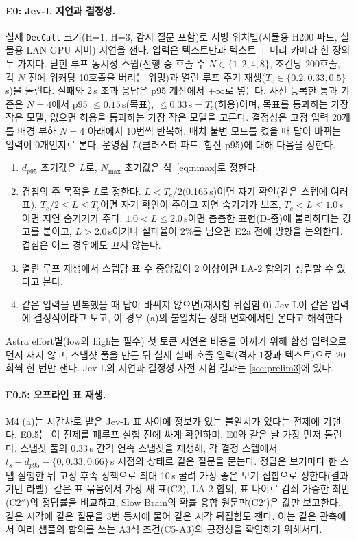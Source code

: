 \paragraph{E0: Jev-L 지연과 결정성.}
실제 \texttt{DecCall} 크기(H=1, H=3, 감시 질문 포함)로 서빙 위치별(시뮬용 H200 파드, 실물용 LAN GPU 서버) 지연을 잰다. 입력은 텍스트만과 텍스트 + 머리 카메라 한 장의 두 가지다. 닫힌 루프 동시성 스윕(진행 중 호출 수 $N\in\{1,2,4,8\}$, 조건당 200호출, 각 $N$ 전에 워커당 10호출을 버리는 워밍)과 열린 루프 주기 재생($T_c\in\{0.2,0.33,0.5\}$\,s)을 돌린다. 실패와 2\,s 초과 응답은 p95 계산에서 $+\infty$로 넣는다. 사전 등록한 통과 기준은 $N=4$에서 p95 $\le0.15$\,s(목표), $\le0.33$\,s$=T_c$(허용)이며, 목표를 통과하는 가장 작은 모델, 없으면 허용을 통과하는 가장 작은 모델을 고른다. 결정성은 고정 입력 20개를 배경 부하 $N=4$ 아래에서 10번씩 반복해, 배치 불변 모드를 켰을 때 답이 바뀌는 입력이 0개인지로 본다. 운영점 $L$(클러스터 파드, 합산 p95)에 대해 다음을 정한다.
\begin{enumerate}
  \item $d_{p95}$ 초기값은 $L$로, $N_{\max}$ 초기값은 식~\eqref{eq:nmax}로 정한다.
  \item 겹침의 주 목적을 $L$로 정한다. $L<T_c/2$(0.165\,s)이면 자기 확인(같은 스텝에 여러 표), $T_c/2\le L\le T_c$이면 자기 확인이 주이고 지연 숨기기가 보조, $T_c<L\le1.0$\,s이면 지연 숨기기가 주다. $1.0<L\le2.0$\,s이면 촘촘한 표현(D-줌)에 불리하다는 경고를 붙이고, $L>2.0$\,s이거나 실패율이 2\%를 넘으면 E2a 전에 방향을 논의한다. 겹침은 어느 경우에도 끄지 않는다.
  \item 열린 루프 재생에서 스텝당 표 수 중앙값이 2 이상이면 LA-2 합의가 성립할 수 있다고 본다.
  \item 같은 입력을 반복했을 때 답이 바뀌지 않으면(재시험 뒤집힘 0) Jev-L이 같은 입력에 결정적이라고 보고, 이 경우 (a)의 불일치는 상태 변화에서만 온다고 해석한다.
\end{enumerate}
Astra effort별(low와 high는 필수) 첫 토큰 지연은 비용을 아끼기 위해 합성 입력으로 먼저 재지 않고, 스냅샷 풀을 만든 뒤 실제 실패 호출 입력(격자 1장과 텍스트)으로 20회씩 한 번만 잰다. Jev-L의 지연과 결정성 사전 시험 결과는 \cref{sec:prelim3}에 있다.

\paragraph{E0.5: 오프라인 표 재생.}
M4 (a)는 시간차로 받은 Jev-L 표 사이에 정보가 있는 불일치가 있다는 전제에 기댄다. E0.5는 이 전제를 폐루프 실험 전에 싸게 확인하며, E0와 같은 날 가장 먼저 돌린다. 스냅샷 풀의 0.33\,s 간격 연속 스냅샷을 재생해, 각 결정 스텝에서 $t_s-d_{p95}-\{0,0.33,0.66\}$\,s 시점의 상태로 같은 질문을 묻는다. 정답은 보기마다 한 스텝 실행한 뒤 고정 후속 정책으로 최대 10\,s 굴려 가장 좋은 보기 집합으로 정한다(결과 기반 라벨). 같은 표 묶음에서 가장 새 표(C2), LA-2 합의, 표 나이로 감쇠 가중한 최빈(C2$''$)의 정답률을 비교하고, Slow Brain의 확률 융합 원문판(C2$'$)은 값만 보고한다. 같은 시각에 같은 질문을 3번 동시에 물어 같은 시각 뒤집힘도 잰다. 이는 같은 관측에서 여러 샘플의 합의를 쓰는 A3식 조건(C5-A3)의 공정성을 확인하기 위해서다.

